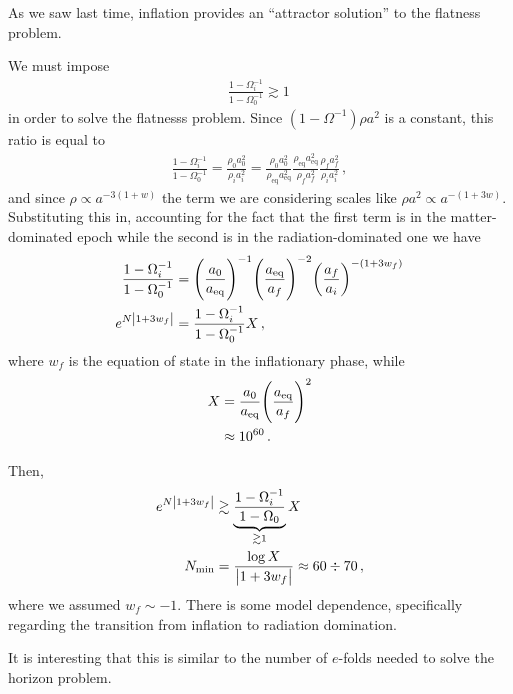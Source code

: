 \documentclass[main.tex]{subfiles}
\begin{document}

As we saw last time, inflation provides an ``attractor solution'' to the flatness problem. 

We must impose 
%
\begin{align}
\frac{1 - \Omega _i^{-1}}{1 - \Omega_0^{-1}} \gtrsim 1
\,
\end{align}
%
in order to solve the flatnesss problem. 
Since \(( 1- \Omega^{-1}) \rho a^2\) is a constant, this ratio is equal to 
%
\begin{align}
\frac{1 - \Omega _i^{-1}}{1 - \Omega_0^{-1}}
= 
\frac{\rho_0 a_0^2}{\rho _i a_i^2} 
= 
\frac{\rho_0 a_0^2}{\rho _{\text{eq}} a _{\text{eq}}^2}
\frac{{\rho _{\text{eq}} a _{\text{eq}}^2}}{\rho _f a_f^2} 
\frac{\rho _f a _f^2}{\rho _i a_i^2} 
\,,
\end{align}
%
and since \(\rho \propto a^{-3 (1+w)}\) the term we are considering scales like \(\rho a^2 \propto a^{-(1 + 3w)}\). 
Substituting this in, accounting for the fact that the first term is in the matter-dominated epoch while the second is in the radiation-dominated one we have 
%
\begin{align}
\frac{1 - \Omega _i^{-1}}{1 - \Omega_0^{-1}}
&= 
\qty(\frac{a_0 }{ a _{\text{eq}}})^{-1} 
\qty(\frac{a _{\text{eq}}}{a_f})^{-2}
\qty(\frac{a_f}{ a_i})^{-(1 + 3 w_f)}
\\
e^{N \abs{1 + 3 w_f}} &= \frac{1 - \Omega_i^{-1}}{1 - \Omega_0^{-1}} X
\,,
\end{align}
%
where \(w_f\) is the equation of state in the inflationary phase, while 
%
\begin{align}
X &= \frac{a_0 }{ a _{\text{eq}}}\qty(\frac{a _{\text{eq}}}{a_f})^2 \\
&\approx 10^{\num{60}}
\,.
\end{align}

Then, 
%
\begin{align}
e^{N \abs{1 + 3 w_f}} &\gtrsim \underbrace{\frac{1 - \Omega _i^{-1}}{1-\Omega_0 }}_{\gtrsim 1} X \\
N _{\text{min}} &= \frac{\log X}{\abs{1 + 3 w_f }} \approx 60 \divisionsymbol 70
\,,
\end{align}
%
where we assumed \(w_f \sim -1\). There is some model dependence, specifically regarding the transition from inflation to radiation domination. 

It is interesting that this is similar to the number of \(e\)-folds needed to solve the horizon problem. 
\end{document}
